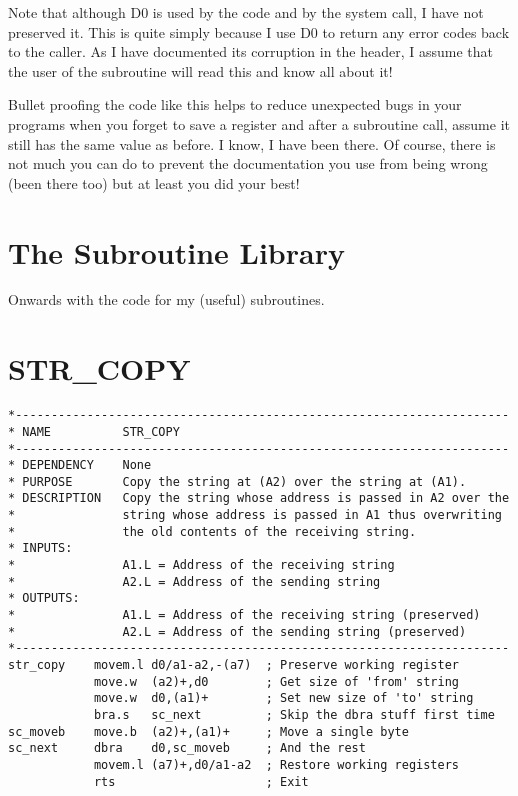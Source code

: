 Note that although D0 is used by the code and by the system call, I
    have not preserved it. This is quite simply because I use D0 to return any
    error codes back to the caller. As I have documented its corruption in the
    header, I assume that the user of the subroutine will read this and know
    all about it!

Bullet proofing the code like this helps to reduce unexpected bugs
    in your programs when you forget to save a register and after a subroutine
    call, assume it still has the same value as before. I know, I have been
    there. Of course, there is not much you can do to prevent the
    documentation you use from being wrong (been there too) but at least you
    did your best!

\section{The Subroutine Library}
\label{ch9-the-library}%

Onwards with the code for my (useful) subroutines.

\section{STR\_COPY}
\label{ch9-STR_COPY}%

\begin{lstlisting}[firstnumber=1,caption={STR\_COPY}]
*---------------------------------------------------------------------
* NAME          STR_COPY
*---------------------------------------------------------------------
* DEPENDENCY    None
* PURPOSE       Copy the string at (A2) over the string at (A1).
* DESCRIPTION   Copy the string whose address is passed in A2 over the
*               string whose address is passed in A1 thus overwriting
*               the old contents of the receiving string.
* INPUTS:
*               A1.L = Address of the receiving string
*               A2.L = Address of the sending string
* OUTPUTS:
*               A1.L = Address of the receiving string (preserved)
*               A2.L = Address of the sending string (preserved)
*---------------------------------------------------------------------
str_copy    movem.l d0/a1-a2,-(a7)  ; Preserve working register
            move.w  (a2)+,d0        ; Get size of 'from' string
            move.w  d0,(a1)+        ; Set new size of 'to' string
            bra.s   sc_next         ; Skip the dbra stuff first time
sc_moveb    move.b  (a2)+,(a1)+     ; Move a single byte
sc_next     dbra    d0,sc_moveb     ; And the rest
            movem.l (a7)+,d0/a1-a2  ; Restore working registers
            rts                     ; Exit
\end{lstlisting}

